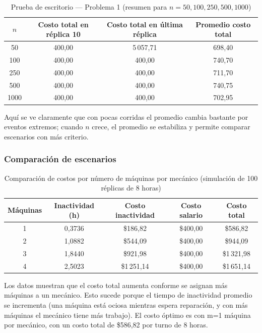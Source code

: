\documentclass[12pt,a4paper]{article}
\begin{document}
\begin{table}[H]
\centering
\caption{Prueba de escritorio — Problema 1 (resumen para $n=50,100,250,500,1000$)}
\begin{tabular}{cccc}
\toprule
\textbf{$n$} & \textbf{Costo total en réplica 10} & \textbf{Costo total en última réplica} & \textbf{Promedio costo total} \\
\midrule
50 & 400,00 & 5\,057,71 & 698,40 \\
100 & 400,00 & 400,00 & 740,70 \\
250 & 400,00 & 400,00 & 711,70 \\
500 & 400,00 & 400,00 & 740,75 \\
1000 & 400,00 & 400,00 & 702,95 \\
\bottomrule
\end{tabular}
\end{table}

\begin{notabox}
Aquí se ve claramente que con pocas corridas el promedio cambia bastante por eventos extremos; cuando $n$ crece, el promedio se estabiliza y permite comparar escenarios con más criterio.
\end{notabox}

\subsubsection{Comparación de escenarios}

\begin{table}[H]
\centering
\caption{Comparación de costos por número de máquinas por mecánico (simulación de 100 réplicas de 8 horas)}
\begin{tabular}{ccccc}
\toprule
\textbf{Máquinas} & \textbf{Inactividad (h)} & \textbf{Costo inactividad} & \textbf{Costo salario} & \textbf{Costo total} \\
\midrule
1 & 0,3736 & \$186,82 & \$400,00 & \$586,82 \\
2 & 1,0882 & \$544,09 & \$400,00 & \$944,09 \\
3 & 1,8440 & \$921,98 & \$400,00 & \$1\,321,98 \\
4 & 2,5023 & \$1\,251,14 & \$400,00 & \$1\,651,14 \\
\bottomrule
\end{tabular}
\end{table}

\begin{notabox}
Los datos muestran que el costo total aumenta conforme se asignan más máquinas a un mecánico. Esto sucede porque el tiempo de inactividad promedio se incrementa (una máquina está ociosa mientras espera reparación, y con más máquinas el mecánico tiene más trabajo). El costo óptimo es con m=1 máquina por mecánico, con un costo total de \$586,82 por turno de 8 horas.
\end{notabox}
\end{document}
